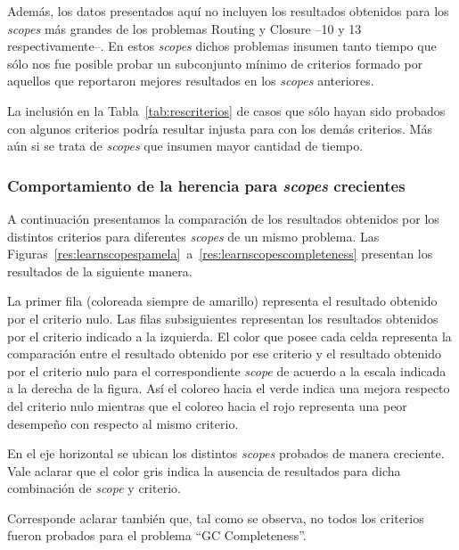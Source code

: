 Además, los datos presentados aquí no incluyen los resultados obtenidos
para los \emph{scopes} más grandes de los problemas Routing y Closure --10 y
13 respectivamente--. En estos \emph{scopes} dichos problemas insumen tanto
tiempo que sólo nos fue posible probar un subconjunto mínimo de criterios
formado por aquellos que reportaron mejores resultados en los \emph{scopes}
anteriores. 

La inclusión en la Tabla~\ref{tab:rescriterios} de casos que sólo
hayan sido probados con algunos criterios podría resultar injusta para con los
demás criterios. Más aún si se trata de \emph{scopes} que insumen mayor
cantidad de tiempo.

\subsubsection{Comportamiento de la herencia para \emph{scopes} crecientes}

A continuación presentamos la comparación de los resultados obtenidos por los
distintos criterios para diferentes \emph{scopes} de un mismo problema. Las
Figuras~\ref{res:learnscopespamela}~a~\ref{res:learnscopescompleteness}
presentan los resultados de la siguiente manera. 

La primer fila (coloreada siempre de amarillo) representa el resultado
obtenido por el criterio nulo. Las filas subsiguientes representan los
resultados obtenidos por el criterio indicado a la izquierda. El color que
posee cada celda representa la comparación entre el resultado obtenido por ese
criterio y el resultado obtenido por el criterio nulo para el correspondiente
\emph{scope} de acuerdo a la escala indicada a la derecha de la figura. Así el
coloreo hacia el verde indica una mejora respecto del criterio nulo mientras
que el coloreo hacia el rojo representa una peor desempeño con respecto al
mismo criterio.

En el eje horizontal se ubican los distintos \emph{scopes} probados de manera
creciente. Vale aclarar que el color gris indica la ausencia de resultados
para dicha combinación de \emph{scope} y criterio.

Corresponde aclarar también que, tal como se observa, no todos los criterios
fueron probados para el problema ``GC Completeness''. 

